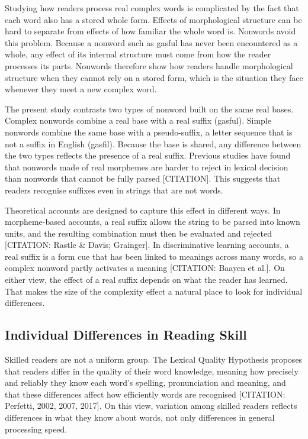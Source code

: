 \documentclass[utf8]{FrontiersinHarvard} %
\begin{document}
	Studying how readers process real complex words is complicated by the fact that each word also has a stored whole form. Effects of morphological structure can be hard to separate from effects of how familiar the whole word is. Nonwords avoid this problem. Because a nonword such as gasful has never been encountered as a whole, any effect of its internal structure must come from how the reader processes its parts. Nonwords therefore show how readers handle morphological structure when they cannot rely on a stored form, which is the situation they face whenever they meet a new complex word.
	
	The present study contrasts two types of nonword built on the same real bases. Complex nonwords combine a real base with a real suffix (gasful). Simple nonwords combine the same base with a pseudo-suffix, a letter sequence that is not a suffix in English (gasfil). Because the base is shared, any difference between the two types reflects the presence of a real suffix. Previous studies have found that nonwords made of real morphemes are harder to reject in lexical decision than nonwords that cannot be fully parsed [CITATION]. This suggests that readers recognise suffixes even in strings that are not words.
	
	Theoretical accounts are designed to capture this effect in different ways. In morpheme-based accounts, a real suffix allows the string to be parsed into known units, and the resulting combination must then be evaluated and rejected [CITATION: Rastle \& Davis; Grainger]. In discriminative learning accounts, a real suffix is a form cue that has been linked to meanings across many words, so a complex nonword partly activates a meaning [CITATION: Baayen et al.]. On either view, the effect of a real suffix depends on what the reader has learned. That makes the size of the complexity effect a natural place to look for individual differences.
	

	\subsection{Individual Differences in Reading Skill}
	
	Skilled readers are not a uniform group. The Lexical Quality Hypothesis proposes that readers differ in the quality of their word knowledge, meaning how precisely and reliably they know each word’s spelling, pronunciation and meaning, and that these differences affect how efficiently words are recognised [CITATION: Perfetti, 2002, 2007, 2017]. On this view, variation among skilled readers reflects differences in what they know about words, not only differences in general processing speed.
	
\end{document}
